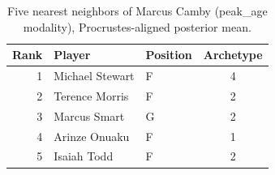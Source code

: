 \begin{table}[htbp]
  \centering\small
  \begin{tabular}{rllc}
    \toprule
    Rank & Player & Position & Archetype \\
    \midrule
    1 & Michael Stewart & F & 4 \\
    2 & Terence Morris & F & 2 \\
    3 & Marcus Smart & G & 2 \\
    4 & Arinze Onuaku & F & 1 \\
    5 & Isaiah Todd & F & 2 \\
    \bottomrule
  \end{tabular}
  \caption{Five nearest neighbors of Marcus Camby (peak_age modality), Procrustes-aligned posterior mean.}
  \label{tab:Marcus_Camby_neighbors_peak_age}
\end{table}

